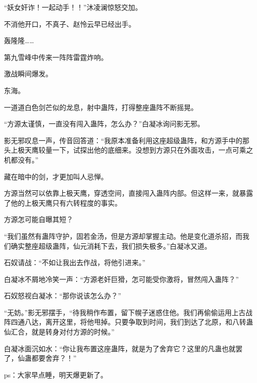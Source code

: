 \begin{this_body}
“妖女奸诈！一起动手！！”沐凌澜惊怒交加。

不消他开口，不真子、赵怜云早已经出手。

轰隆隆……

第九雪峰中传来一阵阵雷霆炸响。

激战瞬间爆发。

东海。

一道道白色剑芒似的龙息，射中蛊阵，打得整座蛊阵不断摇晃。

“方源太谨慎，一直没有闯入蛊阵，怎么办？”白凝冰询问影无邪。

影无邪叹息一声，传音回答道：“我原本准备利用这座超级蛊阵，和方源手中的那头上极天鹰较量一下，试探出他的底细来。没想到方源只在外面攻击，一点可乘之机都没有。”

藏在暗中的剑，才更加叫人忌惮。

方源当然可以依靠上极天鹰，穿透空间，直接闯入蛊阵内部。但这样一来，就暴露了他的上极天鹰只有六转程度的事实。

方源怎可能自曝其短？

“我们虽然有蛊阵守护，固若金汤，但是方源却掌握主动。他是变化道杀招，而我们确实整座超级蛊阵，仙元消耗下去，我们损失极多。”白凝冰又道。

石奴请战：“不如让我出去作战，将他引进来。”

白凝冰不屑地冷笑一声：“方源老奸巨猾，怎可能受你激将，冒然闯入蛊阵？”

石奴怒视白凝冰：“那你说该怎么办？”

“无妨。”影无邪摆手，“待我稍作布置，留下幌子迷惑住他。我们再偷偷运用上古战阵四通八达，离开这里，将他甩掉。只要争取到时间，我们到达了北原，和八转蛊仙汇合，就是转身对付方源的时候。”

白凝冰面沉如水：“你让我布置这座蛊阵，就是为了舍弃它？这里的凡蛊也就罢了，仙蛊都要舍弃？！”

ps：大家早点睡，明天爆更新了。

\end{this_body}

